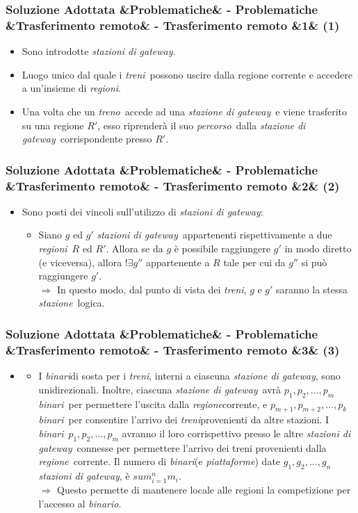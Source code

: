 \documentclass[slidestop,compress,blackandwhite]{beamer}
\newcommand{\ii}[1]{\textit{#1}}
\newcommand{\treno}{\ii{treno}}
\newcommand{\treni}{\ii{treni}}
\newcommand{\stazione}{\ii{stazione}}
\newcommand{\piattaforme}{\ii{piattaforme}}
\newcommand{\binario}{\ii{binario}}
\newcommand{\binari}{\ii{binari}}
\newcommand{\route}{\ii{percorso}}
\newcommand{\regione}{\ii{regione}}
\newcommand{\regioni}{\ii{regioni}}
\newcommand{\gateway}{\ii{stazione di gateway}}
\newcommand{\gateways}{\ii{stazioni di gateway}}
\newcommand{\newtitle}[4]{
	#1 
	\ifx&#2&%
	\else
  		\large- #2
	\fi
	\ifx&#3&%
	\else
  		\normalsize- #3
	\fi
	\ifx&#4&%
	\else
  		\normalsize (#4)
	\fi
}
\newcommand{\newframe}[5]{
	\begin{frame}
		\frametitle{\newtitle{#1}{#2}{#3}{#4}}
		#5
	\end{frame}
}
\newcommand{\myitemize}[1]{\begin{itemize}#1\end{itemize}}
\begin{document}
	\newframe{Soluzione Adottata}{Problematiche}{Trasferimento remoto}{1}{
		\vspace{0.5cm}
		\myitemize{
			\item Sono introdotte \gateways.
			\item Luogo unico dal quale i \treni~possono uscire dalla regione corrente e accedere a un'insieme di \regioni.
			\item Una volta che un \treno~accede ad una \gateway~e viene trasferito su una regione $R'$, esso riprenderà il suo \route~dalla \gateway~corrispondente presso $R'$. 
		}
	}
	
	\newframe{Soluzione Adottata}{Problematiche}{Trasferimento remoto}{2}{
		\vspace{0.5cm}
		\myitemize{
			\item Sono posti dei vincoli sull'utilizzo di \gateways:
				\myitemize{
					\item Siano $g$ ed $g'$ \gateways~appartenenti rispettivamente a due \regioni~$R$ ed $R'$. Allora se da $g$ è possibile raggiungere $g'$ in modo diretto (e viceversa), allora $!\exists g''$ appartenente a $R$ tale per cui da $g''$ si può raggiungere $g'$.\\
					$\Rightarrow$ In questo modo, dal punto di vista dei \treni, $g$ e $g'$ saranno la stessa \stazione~logica.
				
				}
		}
	}
	
	\newframe{Soluzione Adottata}{Problematiche}{Trasferimento remoto}{3}{
		\vspace{0.5cm}
		\myitemize{
			\item[] 
				\myitemize{
					\item I \binari di sosta per i \treni, interni a ciascuna \gateway, sono unidirezionali. Inoltre, ciascuna \gateway~avrà $p_1,p_2,...,p_m$ \binari~per permettere l'uscita dalla \regione corrente, e $p_{m+1},p_{m+2},...,p_k$ \binari~per consentire l'arrivo dei \treni provenienti da altre stazioni. I \binari~$p_1,p_2,...,p_m$ avranno il loro corrispettivo presso le altre \gateways~connesse per permettere l'arrivo dei treni provenienti dalla \regione~corrente. Il numero di \binari (e \piattaforme) date  $g_1,g_2,...,g_n$ \gateways, è $sum_{i=1}^{n} m_i$.\\
						$\Rightarrow$ Questo permette di mantenere locale alle regioni la competizione per l'accesso al \binario.	
				}
		}	
	}	
		
\end{document}
